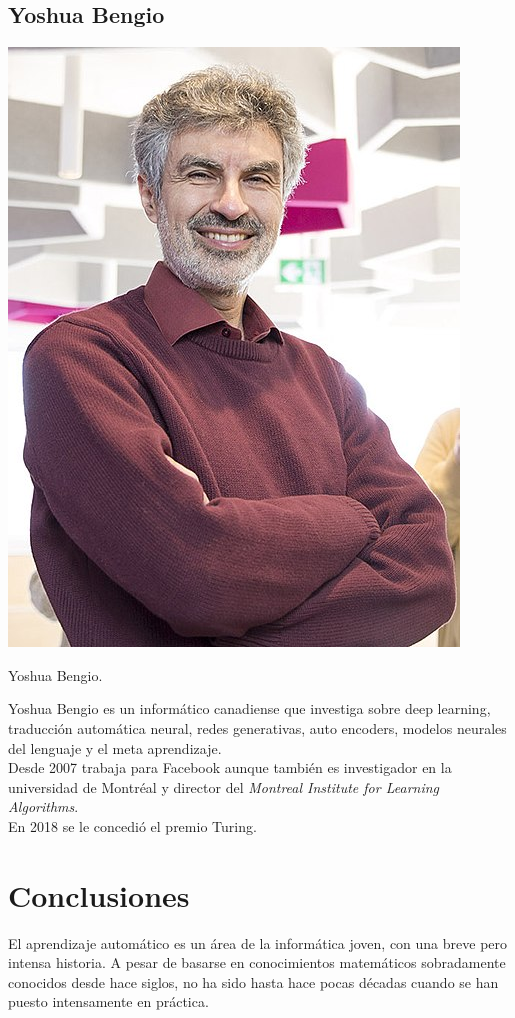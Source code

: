 \documentclass[11pt,twoside,titlepage,a4paper]{article}
\numberwithin{equation}{section} %
\theoremstyle{usual}
\begin{document}
\subsection{Yoshua Bengio}
\begin{marginfigure}
    \includegraphics[width=\marginparwidth]{Source/images/Yoshua_Bengio.jpg}
    \caption{Yoshua Bengio.}
\end{marginfigure}

Yoshua Bengio \cite{bengio-wikipedia} es un informático canadiense que investiga sobre deep learning, traducción automática neural, redes generativas, auto encoders, modelos neurales del lenguaje y el meta aprendizaje. \\

Desde 2007 trabaja para Facebook aunque también es investigador en la universidad de Montréal y director del \textit{Montreal Institute for Learning Algorithms}. \\

En 2018 se le concedió el premio Turing. 

\newpage\restoregeometry
\section{Conclusiones}
El aprendizaje automático es un área de la informática joven, con una breve pero intensa historia. A pesar de basarse en conocimientos matemáticos sobradamente conocidos desde hace siglos, no ha sido hasta hace pocas décadas cuando se han puesto intensamente en práctica. \\
\end{document}
